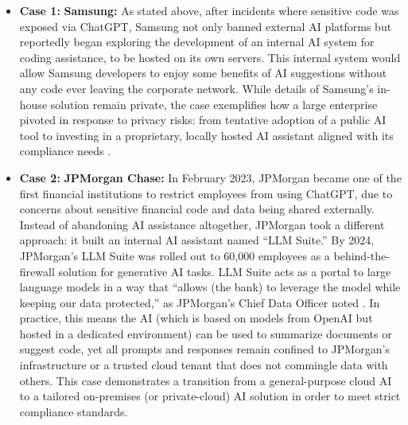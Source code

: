 \begin{itemize}
	\item \textbf{Case 1:} \textbf{Samsung:} As stated above, after incidents where sensitive code was exposed via ChatGPT, Samsung not only banned external \gls{AI} platforms but reportedly began exploring the development of an internal \gls{AI} system for coding assistance, to be hosted on its own servers. This internal system would allow Samsung developers to enjoy some benefits of \gls{AI} suggestions without any code ever leaving the corporate network. While details of Samsung’s in-house solution remain private, the case exemplifies how a large enterprise pivoted in response to privacy risks: from tentative adoption of a public \gls{AI} tool to investing in a proprietary, locally hosted \gls{AI} assistant aligned with its compliance needs \autocite{Park2023Samsung}.
	\item \textbf{Case 2:} \textbf{JPMorgan Chase:} In February 2023, JPMorgan became one of the first financial institutions to restrict employees from using ChatGPT, due to concerns about sensitive financial code and data being shared externally. Instead of abandoning \gls{AI} assistance altogether, JPMorgan took a different approach: it built an internal \gls{AI} assistant named “LLM Suite.” By 2024, JPMorgan’s \gls{LLM} Suite was rolled out to 60,000 employees as a behind-the-firewall solution for generative \gls{AI} tasks. \gls{LLM} Suite acts as a portal to large language models in a way that “allows (the bank) to leverage the model while keeping our data protected,” as JPMorgan’s Chief Data Officer noted \autocite{Kessel2024}. In practice, this means the \gls{AI} (which is based on models from OpenAI but hosted in a dedicated environment) can be used to summarize documents or suggest code, yet all prompts and responses remain confined to JPMorgan’s infrastructure or a trusted cloud tenant that does not commingle data with others. This case demonstrates a transition from a general-purpose cloud \gls{AI} to a tailored on-premises (or private-cloud) \gls{AI} solution in order to meet strict compliance standards.

\end{itemize}
